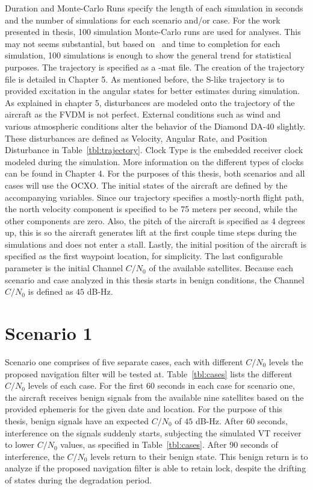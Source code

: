 Duration and Monte-Carlo Runs specify the length of each simulation in seconds and the number of simulations for each scenario and/or case. For the work presented in thesis, 100 simulation Monte-Carlo runs are used for analyses. This may not seems substantial, but based on~\cite{khaghaniAssessmentVDMbasedAutonomous2018,khaghaniAutonomousVehicleDynamic2016,mwenegohaModelbasedTightlyCoupled2020} and time to completion for each simulation, 100 simulations is enough to show the general trend for statistical purposes. The trajectory is specified as a -mat file. The creation of the trajectory file is detailed in Chapter 5. As mentioned before, the S-like trajectory is to provided excitation in the angular states for better estimates during simulation. As explained in chapter 5, disturbances are modeled onto the trajectory of the aircraft as the FVDM is not perfect. External conditions such as wind and various atmospheric conditions alter the behavior of the Diamond DA-40 slightly. These disturbances are defined as Velocity, Angular Rate, and Position Disturbance in Table~\ref{tbl:trajectory}. Clock Type is the embedded receiver clock modeled during the simulation. More information on the different types of clocks can be found in Chapter 4. For the purposes of this thesis, both scenarios and all cases will use the OCXO\@. The initial states of the aircraft are defined by the accompanying variables. Since our trajectory specifies a mostly-north flight path, the north velocity component is specified to be 75 meters per second, while the other components are zero. Also, the pitch of the aircraft is specified as 4 degrees up, this is so the aircraft generates lift at the first couple time steps during the simulations and does not enter a stall. Lastly, the initial position of the aircraft is specified as the first waypoint location, for simplicity. The last configurable parameter is the initial Channel \(C/N_0\) of the available satellites. Because each scenario and case analyzed in this thesis starts in benign conditions, the Channel \(C/N_0\) is defined as \(45\) dB-Hz.

\section{\textbf{Scenario 1}}
Scenario one comprises of five separate cases, each with different \(C/N_0\) levels the proposed navigation filter will be tested at. Table~\ref{tbl:cases} lists the different \(C/N_0\) levels of each case. For the first 60 seconds in each case for scenario one, the aircraft receives benign signals from the available nine satellites based on the provided ephemeris for the given date and location. For the purpose of this thesis, benign signals have an expected \(C/N_0\) of \(45\) dB-Hz. After 60 seconds, interference on the signals suddenly starts, subjecting the simulated VT receiver to lower \(C/N_0\) values, as specified in Table~\ref{tbl:cases}. After 90 seconds of interference, the \(C/N_0\) levels return to their benign state. This benign return is to analyze if the proposed navigation filter is able to retain lock, despite the drifting of states during the degradation period.

